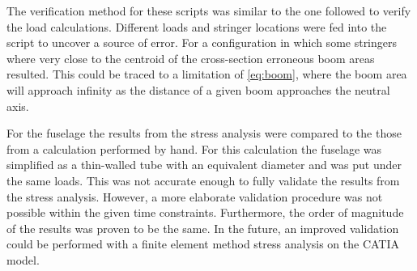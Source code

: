 The verification method for these scripts was similar to the one followed to verify the load calculations. Different loads and stringer locations were fed into the script to uncover a source of error. For a configuration in which some stringers where very close to the centroid of the cross-section erroneous boom areas resulted. This could be traced to a limitation of \autoref{eq:boom}, where the boom area will approach infinity as the distance of a given boom approaches the neutral axis. 

For the fuselage the results from the stress analysis were compared to the those from a calculation performed by hand. For this calculation the fuselage was simplified as a thin-walled tube with an equivalent diameter and was put under the same loads. This was not accurate enough to fully validate the results from the stress analysis. However, a more elaborate validation procedure was not possible within the given time constraints. Furthermore, the order of magnitude of the results was proven to be the same. In the future, an improved validation could be performed with a finite element method stress analysis on the CATIA model. 

